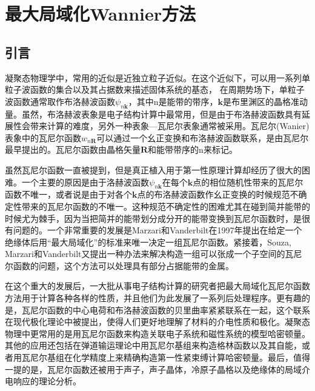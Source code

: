 \section{最大局域化Wannier方法}
\subsection{引言}
凝聚态物理学中，常用的近似是近独立粒子近似。在这个近似下，可以用一系列单粒子波函数的集合以及其占据数来描述固体系统的基态，
在周期势场下，单粒子波函数通常取作布洛赫波函数$\psi_{n\bm{k}}$，其中n是能带的带序，$\bm{k}$是布里渊区的晶格准动量。虽然，布洛赫波表象是电子结构计算中最常用，但是由于布洛赫波函数具有延展性会带来计算的难度，另外一种表象—瓦尼尔表象通常被采用。瓦尼尔(Wanier)表象中的瓦尼尔函数$w_{n\bm{R}}$可以通过一个幺正变换和布洛赫波函数联系，是由瓦尼尔最早提出的。瓦尼尔函数由晶格矢量$\bm{R}$和能带带序的n来标记。

虽然瓦尼尔函数一直被提到，但是真正植入用于第一性原理计算却经历了很大的困难。一个主要的原因是由于洛赫波函数$\psi_{n\bm{k}}$在每个$\bm{k}$点的相位随机性带来的瓦尼尔函数不唯一，或者说是由于对各个$\bm{k}$点的布洛赫波函数作幺正变换的时候规范不确定性带来的瓦尼尔函数的不唯一。这种规范不确定性的困难尤其在碰到简并能带的时候尤为棘手，因为当把简并的能带划分成分开的能带变换到瓦尼尔函数时，是很有问题的。一个非常重要的发展是Marzari和Vanderbilt\cite{marzari_maximally_2012}在1997年提出在给定一个绝缘体后用“最大局域化”的标准来唯一决定一组瓦尼尔函数。紧接着，Souza, Marzari和Vanderbilt\cite{souza_maximally-localized_2001}又提出一种办法来解决构造一组可以张成一个子空间的瓦尼尔函数的问题，这个方法可以处理具有部分占据能带的金属。

在这个重大的发展后，一大批从事电子结构计算的研究者把最大局域化瓦尼尔函数方法用于计算各种各样的性质，并且他们为此发展了一系列后处理程序。更有趣的是，瓦尼尔函数的中心电荷和布洛赫波函数的贝里曲率紧紧联系在一起，这个联系在现代极化理论中被提出，使得人们更好地理解了材料的介电性质和极化\cite{king-smith_theory_1993}。凝聚态物理中更常用的是用瓦尼尔函数来构造关联电子系统和磁性系统的模型哈密顿量。其他的应用还包括在弹道输运理论中用瓦尼尔基组来构造格林函数以及其自能，或者用瓦尼尔基组在化学精度上来精确构造第一性紧束缚计算哈密顿量。最后，值得一提的是，瓦尼尔函数还被用于声子，声子晶体，冷原子晶格以及绝缘体的局域介电响应的理论分析。

